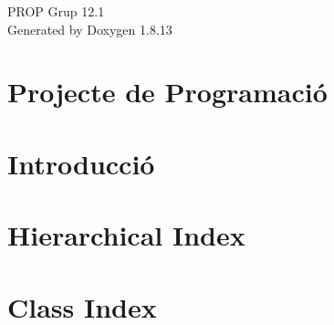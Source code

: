 \documentclass[twoside]{book}
\newcommand{\+}{\discretionary{\mbox{\scriptsize$\hookleftarrow$}}{}{}}
\newcommand{\clearemptydoublepage}{%
  \newpage{\pagestyle{empty}\cleardoublepage}%
}
\begin{document}
\hypersetup{pageanchor=false,
             bookmarksnumbered=true,
             pdfencoding=unicode
            }
\begin{titlepage}
\vspace*{7cm}
\begin{center}%
{\Large P\+R\+OP Grup 12.1 }\\
\vspace*{1cm}
{\large Generated by Doxygen 1.8.13}\\
\end{center}
\end{titlepage}
\clearemptydoublepage
{}
\tableofcontents
\clearemptydoublepage
{}
\hypersetup{pageanchor=true}

\chapter{Projecte de Programació}
\label{index}\hypertarget{index}{}
\chapter{Introducció}
\label{md_src_persistencia_data_Jocs_de_proves}

\chapter{Hierarchical Index}

\chapter{Class Index}

\end{document}
